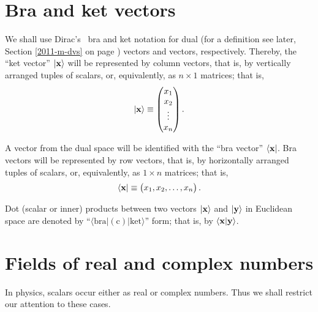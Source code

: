 \section{Bra and ket vectors}
\label{2016-pu-book-chapter-bkv} %

We shall use Dirac's~\cite{dirac} bra and ket notation for dual (for a definition see later, Section \ref{2011-m-dvs} on page \pageref{2011-m-dvs})
vectors and vectors, respectively.
Thereby,
the ``ket vector'' $\vert {\bf x}\rangle$
will be represented by column vectors, that is, by vertically arranged tuples of scalars,
or, equivalently, as $n \times 1$ matrices; that is,
\begin{equation}
\vert {\bf x}\rangle
\equiv
\begin{pmatrix}
x_1\\
x_2\\
\vdots \\
x_n
\end{pmatrix}
.
\end{equation}


A vector  from the dual space
will be identified with the ``bra vector'' $\langle {\bf x}\vert$.
Bra vectors will be represented by row vectors, that is, by horizontally arranged tuples of scalars,
or, equivalently, as $1 \times n$ matrices; that is,
\begin{equation}
\langle {\bf x}   \vert
\equiv
\begin{pmatrix}
x_1,
x_2,
\ldots ,
x_n
\end{pmatrix}
.
\end{equation}



Dot (scalar or inner) products between two vectors $\vert {\bf x}\rangle $ and $\vert {\bf y}\rangle $   in Euclidean space are
denoted by ``$\langle \textrm{bra} \vert  (\textrm{c}) \vert \textrm{ket}  \rangle$''  form;
that is, by $\langle {\bf x} \vert  {\bf y}  \rangle$.










\section{Fields of real and complex numbers}

In physics, scalars occur either as real or complex numbers.
Thus we shall restrict our attention to these cases.

